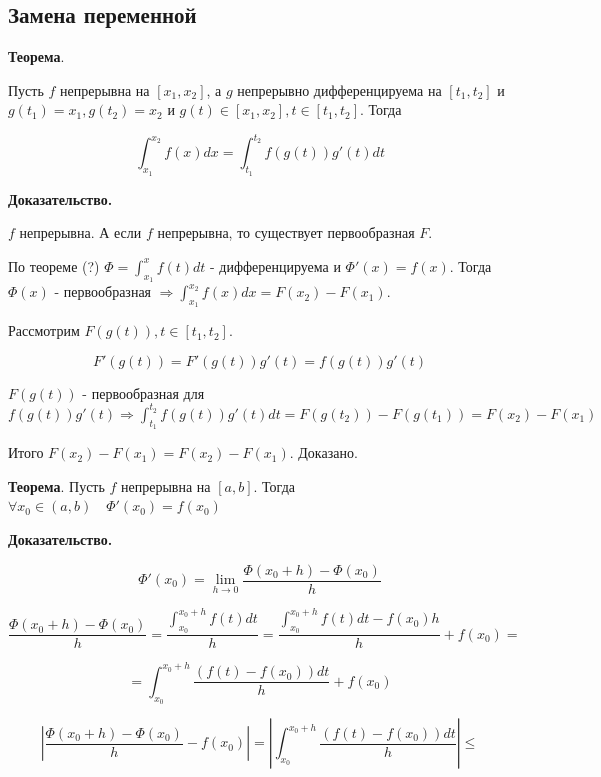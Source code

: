 \documentclass[a4paper]{article}
\begin{document}
\begin{definit}
\hypertarget{p17}{}
\subsection*{Замена переменной}

\begin{htheorem}\textbf{Теорема}.

Пусть $f$ непрерывна на $[x_1, x_2]$, а $g$ непрерывно дифференцируема на $[t_1, t_2]$ и $g(t_1) = x_1, g(t_2) = x_2$ и $g(t) \in [x_1, x_2], t \in [t_1, t_2]$. Тогда

\[
\int_{x_1}^{x_2} f(x)dx = \int_{t_1}^{t_2} f(g(t)) g'(t) dt
\]
\end{htheorem}

\begin{hproof}\textbf{Доказательство.}

$f$ непрерывна. А если $f$ непрерывна, то существует первообразная $F$.

По теореме (?) $\Phi = \int_{x_1}^x f(t)dt$ - дифференцируема и $\Phi'(x) = f(x)$. Тогда $\Phi(x)$ - первообразная $\Rightarrow \int_{x_1}^{x_2} f(x)dx = F(x_2) - F(x_1)$.

Рассмотрим $F(g(t)), t \in [t_1, t_2]$.

\[
F'(g(t)) = F'(g(t))g'(t) = f(g(t))g'(t)
\]

$F(g(t))$ - первообразная для $f(g(t))g'(t) \Rightarrow \int_{t_1}^{t_2} f(g(t))g'(t)dt = F(g(t_2)) - F(g(t_1)) = F(x_2) - F(x_1)$

Итого $F(x_2) - F(x_1) = F(x_2) - F(x_1)$. Доказано.
\end{hproof}

\begin{htheorem}\textbf{Теорема}.
Пусть $f$ непрерывна на $[a,b]$. Тогда $\forall x_0 \in (a,b) \quad \Phi'(x_0) = f(x_0)$

\end{htheorem}

\begin{hproof}\textbf{Доказательство.}

\[
\Phi'(x_0) = \lim_{h \rightarrow 0} \frac{\Phi(x_0 + h) - \Phi (x_0)}{h}
\]

\[
\frac{\Phi(x_0 + h) - \Phi (x_0)}{h} = \frac{\int_{x_0}^{x_0+h} f(t)dt}{h} = \frac{\int_{x_0}^{x_0+h} f(t)dt - f(x_0)h}{h} + f(x_0) = 
\]

\[
 = \int_{x_0}^{x_0+h} \frac{(f(t)-f(x_0))dt}{h} + f(x_0)
\]

\[
\left| \frac{\Phi(x_0+h)-\Phi(x_0)}{h} - f(x_0) \right| = \left| \int_{x_0}^{x_0+h} \frac{(f(t)-f(x_0))dt}{h} \right| \leq 
\]


\end{hproof}
\end{definit}
\end{document}
